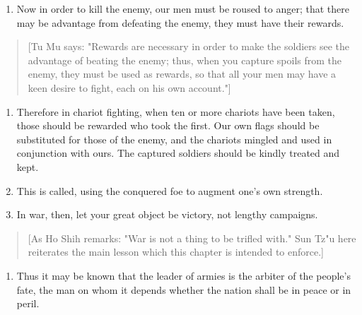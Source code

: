 \documentclass[10pt,a4paper]{book}
\begin{document}
\begin{enumerate}[leftmargin=*, label=\arabic*., wide=0pt, resume]
\item Now in order to kill the enemy, our men must be roused to anger; that there may be advantage from defeating the enemy, they must have their rewards.
\end{enumerate}

{\small
\begin{quote}
[Tu Mu says: "Rewards are necessary in order to make the soldiers see the advantage of beating the enemy; thus, when you capture spoils from the enemy, they must be used as rewards, so that all your men may have a keen desire to fight, each on his own account."]
\end{quote}
}

\begin{enumerate}[leftmargin=*, label=\arabic*., wide=0pt, resume]
\item Therefore in chariot fighting, when ten or more chariots have been taken, those should be rewarded who took the first. Our own flags should be substituted for those of the enemy, and the chariots mingled and used in conjunction with ours. The captured soldiers should be kindly treated and kept.
\item This is called, using the conquered foe to augment one's own strength.
\item In war, then, let your great object be victory, not lengthy campaigns.
\end{enumerate}

{\small
\begin{quote}
[As Ho Shih remarks: "War is not a thing to be trifled with." Sun Tz"u here reiterates the main lesson which this chapter is intended to enforce.]
\end{quote}
}

\begin{enumerate}[leftmargin=*, label=\arabic*., wide=0pt, resume]
\item Thus it may be known that the leader of armies is the arbiter of the people's fate, the man on whom it depends whether the nation shall be in peace or in peril.
\end{enumerate}
\end{document}
